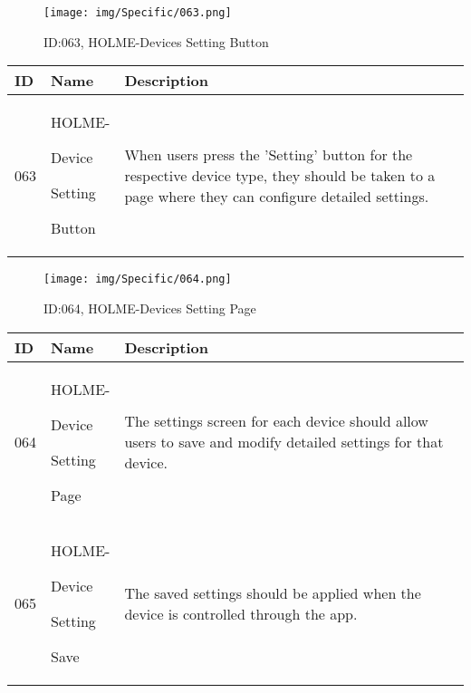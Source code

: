 \documentclass[conference]{IEEEtran}
\begin{document}
\begin{enumerate}
\begin{figure}[h]
\centering
\texttt{[image: img/Specific/063.png]}
\caption{ID:063, HOLME-Devices Setting Button}
\end{figure}
\begin{table}[h]
\def\arraystretch{1.2} \small
    \begin{tabular}{|p{1cm}|p{1.8cm}|p{5.0cm}|}
        \hline
        ID & Name & Description\\ \hline
         063 \par  & HOLME-\par Device \par Setting \par Button  & When users press the 'Setting' button for the respective device type, they should be taken to a page where they can configure detailed settings. \\ \hline
    \end{tabular}
\end{table}

\begin{figure}[h]
\centering
\texttt{[image: img/Specific/064.png]}
\caption{ID:064, HOLME-Devices Setting Page}
\end{figure}
\begin{table}[h]
\def\arraystretch{1.2} \small
    \begin{tabular}{|p{1cm}|p{1.8cm}|p{5.0cm}|}
        \hline
        ID & Name & Description\\ \hline
         064 \par  & HOLME-\par Device \par Setting \par Page  & The settings screen for each device should allow users to save and modify detailed settings for that device. \\ \hline
         065 \par  & HOLME-\par Device \par Setting \par Save  & The saved settings should be applied when the device is controlled through the app. \\ \hline
    \end{tabular}
\end{table}
\clearpage


\end{enumerate}
\end{document}
